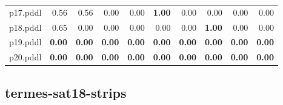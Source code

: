 \documentclass{article}
\begin{document}
\begin{tabular}{@{}lrrrrrrrrr@{}}
p17.pddl & 0.56 & 0.56 & 0.00 & 0.00 & \textbf{1.00} & 0.00 & 0.00 & 0.00 & 0.00 \\
p18.pddl & 0.65 & 0.00 & 0.00 & 0.00 & 0.00 & 0.00 & \textbf{1.00} & 0.00 & 0.00 \\
p19.pddl & \textbf{0.00} & \textbf{0.00} & \textbf{0.00} & \textbf{0.00} & \textbf{0.00} & \textbf{0.00} & \textbf{0.00} & \textbf{0.00} & \textbf{0.00} \\
p20.pddl & \textbf{0.00} & \textbf{0.00} & \textbf{0.00} & \textbf{0.00} & \textbf{0.00} & \textbf{0.00} & \textbf{0.00} & \textbf{0.00} & \textbf{0.00} \\
\end{tabular}

\hypertarget{quality-termes-sat18-strips}{}
\subsection*{termes-sat18-strips}
\end{document}
